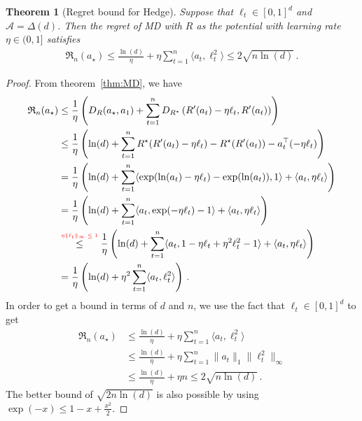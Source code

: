 \documentclass{article}
\theoremstyle{plain}
\newtheorem{theorem}{Theorem}
\theoremstyle{definition}
\newcommand{\Reg}{\mathfrak{R}}
\newcommand{\cA}{\mathcal A}
\newcommand{\abovelabel}[1]{\stackrel{\raisebox{0.5mm}{\textrm{\tiny \color{red} #1}}}}
\newcommand{\mdalg}{\textsf{MD}\xspace}
\newcommand{\Hedge}{\textsf{Hedge}\xspace}
\begin{document}
\begin{theorem}[Regret bound for \Hedge]\label{thm:md-simplex}
    Suppose that $\ell_t \in [0,1]^d$ and $\cA = \Delta(d)$.
    Then the regret of \mdalg with $R$ as the potential
    with learning rate $\eta \in (0,1]$
    satisfies
    \begin{align*}
        \Reg_n(a_\star) \leq
        \frac{\ln(d)}{\eta}
        +
        \eta\sum_{t=1}^{n} \langle a_t, \ell_t^2\rangle
        \leq 2 \sqrt{n\ln(d)}\,.
    \end{align*}
\end{theorem}
\begin{proof}
    From theorem~\ref{thm:MD}, we have
    \begin{align*}
        \Reg_n(a_\star)
         & \leq
        \frac{1}{\eta}
        \left(
        D_R(a_\star, a_1) + \sum_{t=1}^{n} D_{R^\star}\left(R'(a_t) - \eta \ell_t, R'(a_t)\right)
        \right)
        \\
         & \leq
        \frac{1}{\eta}
        \left(
        \ln(d) + \sum_{t=1}^{n} R^\star(R'(a_t) - \eta \ell_t) - R^\star(R'(a_t)) - a_t^\top(-\eta \ell_t)
        \right)
        \\
         & =
        \frac{1}{\eta}
        \left(
        \ln(d) + \sum_{t=1}^{n} \langle \exp(\ln(a_t) - \eta \ell_t) - \exp(\ln(a_t)), 1 \rangle + \langle a_t, \eta \ell_t\rangle
        \right)
        \\
         & =
        \frac{1}{\eta}
        \left(
        \ln(d) + \sum_{t=1}^{n} \langle a_t, \exp(- \eta \ell_t) - 1 \rangle + \langle a_t, \eta \ell_t\rangle
        \right)
        \\
         &
        \abovelabel{$\eta \|\ell_t\|_\infty \leq 1$}
        \leq
        \frac{1}{\eta}
        \left(
        \ln(d) + \sum_{t=1}^{n} \langle a_t, 1 - \eta \ell_t + \eta^2 \ell_t^2 - 1 \rangle + \langle a_t, \eta \ell_t\rangle
        \right)
        \\
         &
        =
        \frac{1}{\eta}
        \left(
        \ln(d) + \eta^2\sum_{t=1}^{n} \langle a_t, \ell_t^2\rangle
        \right)\,.
    \end{align*}
    In order to get a bound in terms of $d$ and $n$,
    we use the fact that $\ell_t \in [0,1]^d$ to get
    \begin{align*}
        \Reg_n(a_\star) & \leq
        \frac{\ln(d)}{\eta}
        +
        \eta\sum_{t=1}^{n} \langle a_t, \ell_t^2\rangle \\
                        & \leq
        \frac{\ln(d)}{\eta}
        +
        \eta \sum_{t=1}^{n} \|a_t\|_1 \|\ell_t^2\|_\infty
        \\
                        & \leq
        \frac{\ln(d)}{\eta}
        +
        \eta n
        \leq 2 \sqrt{n\ln(d)}\,.
    \end{align*}
    The better bound of $\sqrt{2n\ln(d)}$ is also possible by using
    $\exp(-x) \leq 1 - x + \frac{x^2}{2}$.
\end{proof}
\end{document}
